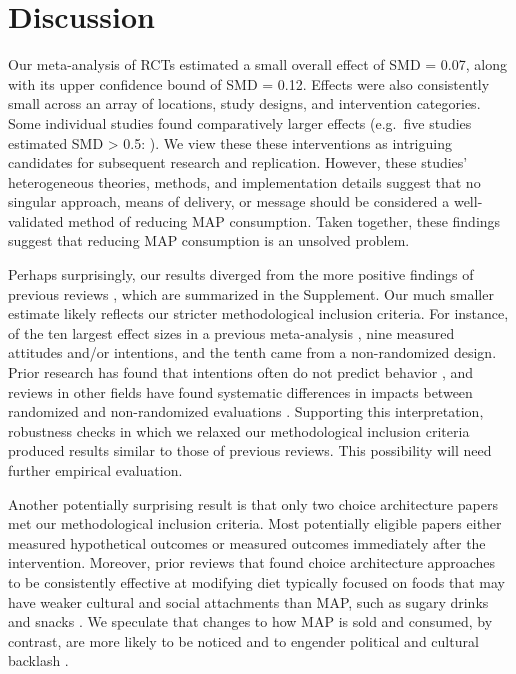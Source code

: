 \documentclass[preprint, 3p,
authoryear]{elsarticle} %
\begin{document}
\section{Discussion}\label{Sec4}

Our meta-analysis of RCTs estimated a small overall effect of SMD =
0.07, along with its upper confidence bound of SMD = 0.12. Effects were
also consistently small across an array of locations, study designs, and
intervention categories. Some individual studies found comparatively
larger effects (e.g.~five studies estimated SMD \textgreater{} 0.5:
\citep{carfora2023, merrill2009, kanchanachitra2020, bianchi2022, piester2020}).
We view these these interventions as intriguing candidates for
subsequent research and replication. However, these studies'
heterogeneous theories, methods, and implementation details suggest that
no singular approach, means of delivery, or message should be considered
a well-validated method of reducing MAP consumption. Taken together,
these findings suggest that reducing MAP consumption is an unsolved
problem.

Perhaps surprisingly, our results diverged from the more positive
findings of previous reviews
\citep{mathur2021meta, meier2022, mertens2022}, which are summarized in
the Supplement. Our much smaller estimate likely reflects our stricter
methodological inclusion criteria. For instance, of the ten largest
effect sizes in a previous meta-analysis
\citep{mathur2021effectiveness}, nine measured attitudes and/or
intentions, and the tenth came from a non-randomized design. Prior
research has found that intentions often do not predict behavior
\citep{mathur2021effectiveness}, and reviews in other fields have found
systematic differences in impacts between randomized and non-randomized
evaluations \citep{porat2024, stevenson2023}. Supporting this
interpretation, robustness checks in which we relaxed our methodological
inclusion criteria produced results similar to those of previous
reviews. This possibility will need further empirical evaluation.

Another potentially surprising result is that only two choice
architecture papers met our methodological inclusion criteria. Most
potentially eligible papers either measured hypothetical outcomes or
measured outcomes immediately after the intervention. Moreover, prior
reviews that found choice architecture approaches to be consistently
effective at modifying diet typically focused on foods that may have
weaker cultural and social attachments than MAP, such as sugary drinks
and snacks \citep{venema2020, adriaanse2009}. We speculate that changes
to how MAP is sold and consumed, by contrast, are more likely to be
noticed and to engender political and cultural backlash
\citep{popper2019}.
\end{document}
